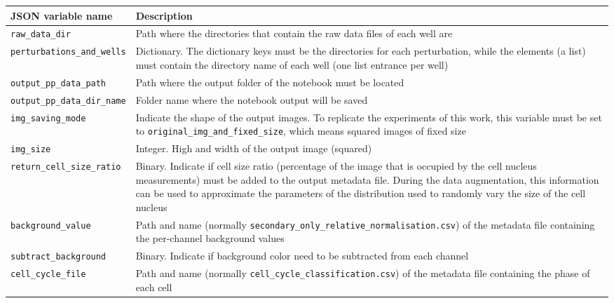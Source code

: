 \setlength{\mylinewidth}{\linewidth-7pt}%
\setlength{\mylengtha}{0.4\mylinewidth-2\arraycolsep}%
\setlength{\mylengthb}{0.6\mylinewidth-2\arraycolsep}%

\begin{longtable}{>{\centering\arraybackslash}m{\mylengtha} | m{\mylengthb}}
    \hline
    JSON variable name & Description \\
    \hline
    \texttt{raw\_data\_dir} & Path where the directories that contain the raw data files of each well are \\
    \hline
    \texttt{perturbations\_and\_wells} & Dictionary. The dictionary keys must be the directories for each perturbation, while the elements (a list) must contain the directory name of each well (one list entrance per well) \\
    \hline
    \texttt{output\_pp\_data\_path} & Path where the output folder of the notebook must be located \\
    \hline
    \texttt{output\_pp\_data\_dir\_name} & Folder name where the notebook output will be saved \\
    \hline
    \texttt{img\_saving\_mode} & Indicate the shape of the output images. To replicate the experiments of this work, this variable must be set to \texttt{original\_img\_and\_fixed\_size}, which means squared images of fixed size \\
    \hline
    \texttt{img\_size} & Integer. High and width of the output image (squared) \\
    \hline
    \texttt{return\_cell\_size\_ratio} & Binary. Indicate if cell size ratio (percentage of the image that is occupied by the cell nucleus measurements) must be added to the output metadata file. During the data augmentation, this information can be used to approximate the parameters of the distribution used to randomly vary the size of the cell nucleus \\
    \hline
    \texttt{background\_value} & Path and name (normally \texttt{secondary\_only\_relative\_normalisation.csv}) of the metadata file containing the per-channel background values \\
    \hline
    \texttt{subtract\_background} & Binary. Indicate if background color need to be subtracted from each channel \\
    \hline
    \texttt{cell\_cycle\_file} & Path and name (normally \texttt{cell\_cycle\_classification.csv}) of the metadata file containing the phase of each cell \\
    \hline

\end{longtable}
